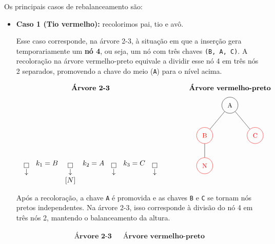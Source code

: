 \medskip

Os principais casos de rebalanceamento são:

\begin{itemize}

\item \textbf{Caso 1 (Tio vermelho):} recolorimos pai, tio e avô.

Esse caso corresponde, na árvore 2-3, à situação em que a inserção gera temporariamente um \textbf{nó 4}, ou seja, um nó com três chaves \texttt{(B, A, C)}.  
A recoloração na árvore vermelho-preto equivale a dividir esse nó 4 em três nós 2 separados, promovendo a chave do meio (\texttt{A}) para o nível acima.

\begin{center}
\renewcommand{\arraystretch}{1.5}
\[
\begin{array}{ccc}
\textbf{Árvore 2-3} & & \textbf{Árvore vermelho-preto} \\[6pt]

\begin{array}{cccccccc}
  \boxed{}    & k_1 = B & \boxed{}    & k_2 = A & \boxed{}    & k_3 = C & \boxed{} \\
  \downarrow  &         & \downarrow  &         & \downarrow  &         & \downarrow  \\
              &         & [N]         &         &             &         &             \\
\end{array}

&\qquad&
\begin{tikzpicture}[
  every node/.style={draw, circle, minimum size=8mm, inner sep=0pt, font=\small},
  level distance=1.5cm, sibling distance=2.5cm
]
\tikzset{
  preto/.style={draw=black},
  vermelho/.style={draw=red, text=red}
}
\node[preto] {A}
  child {
    node[vermelho] {B}
      child[grow=down] { node[vermelho] {N} } %
  }
  child { node[vermelho] {C} };
\end{tikzpicture}
\end{array}
\]
\end{center}

Após a recoloração, a chave \texttt{A} é promovida e as chaves \texttt{B} e \texttt{C} se tornam nós pretos independentes.  
Na árvore 2-3, isso corresponde à divisão do nó 4 em três nós 2, mantendo o balanceamento da altura.

\begin{center}
\renewcommand{\arraystretch}{1.5}
\[
\begin{array}{ccc}
\textbf{Árvore 2-3} & & \textbf{Árvore vermelho-preto} \\[6pt]


\end{array}\]
\end{center}
\end{itemize}

